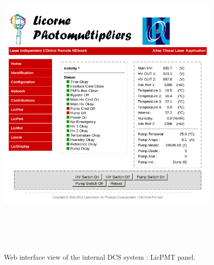 \begin{appendices}
\begin{figure}[htbp]
\centering
\includegraphics[height=16cm]{figures/licorne_web2.png}
\caption{Web interface view of the internal DCS system : LicPMT panel.}\label{fig:licorne_weba}
\end{figure}



\end{appendices}
